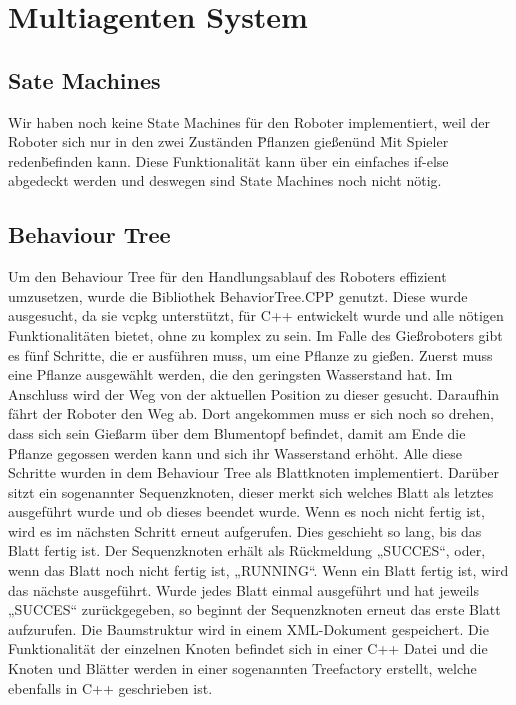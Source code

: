 \section{Multiagenten System}

\subsection{Sate Machines}

Wir haben noch keine State Machines für den Roboter implementiert, weil der Roboter sich nur in den zwei Zuständen \"Pflanzen gießen\" und \"Mit Spieler reden\" befinden kann. Diese Funktionalität kann über ein einfaches if-else abgedeckt werden und deswegen sind State Machines noch nicht nötig.

\subsection{Behaviour Tree}
Um den Behaviour Tree für den Handlungsablauf des Roboters effizient umzusetzen, wurde die Bibliothek BehaviorTree.CPP genutzt. Diese wurde ausgesucht, da sie vcpkg unterstützt, für C++ entwickelt wurde und alle nötigen Funktionalitäten bietet, ohne zu komplex zu sein. 
Im Falle des Gießroboters gibt es fünf Schritte, die er ausführen muss, um eine Pflanze zu gießen. Zuerst muss eine Pflanze ausgewählt werden, die den geringsten Wasserstand hat. Im Anschluss wird der Weg von der aktuellen Position zu dieser gesucht. Daraufhin fährt der Roboter den Weg ab. Dort angekommen muss er sich noch so drehen, dass sich sein Gießarm über dem Blumentopf befindet, damit am Ende die Pflanze gegossen werden kann und sich ihr Wasserstand erhöht. Alle diese Schritte wurden in dem Behaviour Tree als Blattknoten implementiert. Darüber sitzt ein sogenannter Sequenzknoten, dieser merkt sich welches Blatt als letztes ausgeführt wurde und ob dieses beendet wurde. Wenn es noch nicht fertig ist, wird es im nächsten Schritt erneut aufgerufen. Dies geschieht so lang, bis das Blatt fertig ist. Der Sequenzknoten erhält als Rückmeldung „SUCCES“, oder, wenn das Blatt noch nicht fertig ist, „RUNNING“. Wenn ein Blatt fertig ist, wird das nächste ausgeführt. Wurde jedes Blatt einmal ausgeführt und hat jeweils „SUCCES“ zurückgegeben, so beginnt der Sequenzknoten erneut das erste Blatt aufzurufen. 
Die Baumstruktur wird in einem XML-Dokument gespeichert. Die Funktionalität der einzelnen Knoten befindet sich in einer C++ Datei und die Knoten und Blätter werden in einer sogenannten Treefactory erstellt, welche ebenfalls in C++ geschrieben ist.
